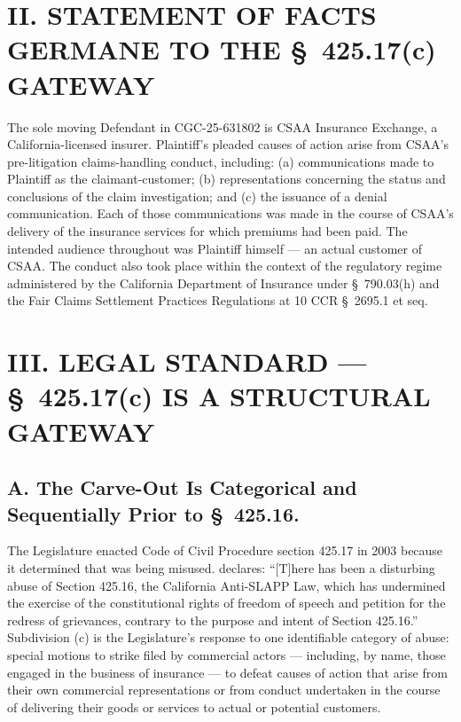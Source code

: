 \section*{II. STATEMENT OF FACTS GERMANE TO THE \S~425.17(c) GATEWAY}

The sole moving Defendant in CGC-25-631802 is CSAA Insurance Exchange, a California-licensed insurer. Plaintiff's pleaded causes of action arise from CSAA's pre-litigation claims-handling conduct, including: (a) communications made to Plaintiff as the claimant-customer; (b) representations concerning the status and conclusions of the claim investigation; and (c) the issuance of a denial communication. Each of those communications was made in the course of CSAA's delivery of the insurance services for which premiums had been paid. The intended audience throughout was Plaintiff himself --- an actual customer of CSAA. The conduct also took place within the context of the regulatory regime administered by the California Department of Insurance under \S~790.03(h) and the Fair Claims Settlement Practices Regulations at 10 CCR \S~2695.1 et seq.

\section*{III. LEGAL STANDARD --- \S~425.17(c) IS A STRUCTURAL GATEWAY}

\subsection*{A. The Carve-Out Is Categorical and Sequentially Prior to \S~425.16.}

The Legislature enacted Code of Civil Procedure section 425.17 in 2003 because it determined that  was being misused.  declares: ``[T]here has been a disturbing abuse of Section 425.16, the California Anti-SLAPP Law, which has undermined the exercise of the constitutional rights of freedom of speech and petition for the redress of grievances, contrary to the purpose and intent of Section 425.16.'' Subdivision (c) is the Legislature's response to one identifiable category of abuse: special motions to strike filed by commercial actors --- including, by name, those engaged in the business of insurance --- to defeat causes of action that arise from their own commercial representations or from conduct undertaken in the course of delivering their goods or services to actual or potential customers.

